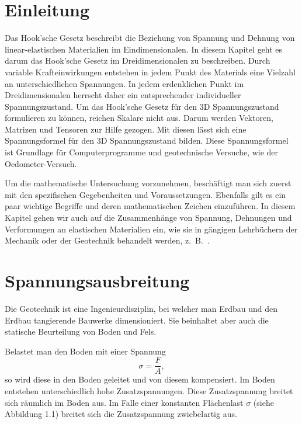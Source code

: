 \section{Einleitung\label{spannung:section:Einleitung}}
Das Hook'sche Gesetz beschreibt die Beziehung von Spannung und Dehnung von linear-elastischen Materialien im Eindimensionalen.
In diesem Kapitel geht es darum das Hook'sche Gesetz im Dreidimensionalen zu beschreiben.
Durch variable Krafteinwirkungen entstehen in jedem Punkt des Materials eine Vielzahl an unterschiedlichen Spannungen.
In jedem erdenklichen Punkt im Dreidimensionalen herrscht daher ein entsprechender individueller Spannungszustand.
Um das Hook'sche Gesetz für den 3D Spannungszustand formulieren zu können, reichen Skalare nicht aus.
Darum werden Vektoren, Matrizen und Tensoren zur Hilfe gezogen.
Mit diesen lässt sich eine Spannungsformel für den 3D Spannungszustand bilden.
Diese Spannungsformel ist Grundlage für Computerprogramme und geotechnische Versuche, wie der Oedometer-Versuch.

Um die mathematische Untersuchung vorzunehmen, beschäftigt man sich zuerst mit den spezifischen Gegebenheiten und Voraussetzungen.
Ebenfalls gilt es ein paar wichtige Begriffe und deren mathematischen Zeichen einzuführen.
In diesem Kapitel gehen wir auch auf die Zusammenhänge von Spannung, Dehnungen und Verformungen an elastischen Materialien ein,
wie sie in gängigen Lehrbüchern der Mechanik oder der Geotechnik behandelt werden, z.~B.~\cite{spannung:Grundlagen-der-Geotechnik}.

\section{Spannungsausbreitung\label{spannung:section:Spannungsausbreitung}}
Die Geotechnik ist eine Ingenieurdisziplin, bei welcher man Erdbau und den Erdbau tangierende Bauwerke dimensioniert.
Sie beinhaltet aber auch die statische Beurteilung von Boden und Fels.

Belastet man den Boden mit einer Spannung
\[
\sigma
=
\frac{F}{A}
,
\]
so wird diese in den Boden geleitet und von diesem kompensiert.
Im Boden entstehen unterschiedlich hohe Zusatzspannungen.
Diese Zusatzspannung breitet sich räumlich im Boden aus.
Im Falle einer konstanten Flächenlast $\sigma$ (siehe Abbildung 1.1) breitet sich die Zusatzspannung zwiebelartig aus.

